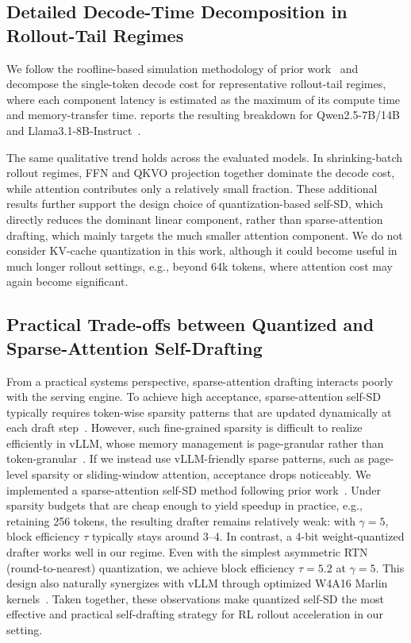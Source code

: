 \subsection{Detailed Decode-Time Decomposition in Rollout-Tail Regimes}
\label{app:decode_breakdown_more}

We follow the roofline-based simulation methodology of prior work~\cite{kim2025beyond} and decompose the single-token decode cost for representative rollout-tail regimes, where each component latency is estimated as the maximum of its compute time and memory-transfer time.
 reports the resulting breakdown for Qwen2.5-7B/14B~\cite{Yang2024Qwen25TR} and Llama3.1-8B-Instruct~\cite{grattafiori2024llama}.

The same qualitative trend holds across the evaluated models.
In shrinking-batch rollout regimes, FFN and QKVO projection together dominate the decode cost, while attention contributes only a relatively small fraction.
These additional results further support the design choice of quantization-based self-SD, which directly reduces the dominant linear component, rather than sparse-attention drafting, which mainly targets the much smaller attention component.
We do not consider KV-cache quantization in this work, although it could become useful in much longer rollout settings, e.g., beyond 64k tokens, where attention cost may again become significant.

\subsection{Practical Trade-offs between Quantized and Sparse-Attention Self-Drafting}
\label{app:practical_quantized_vs_sparse}

From a practical systems perspective, sparse-attention drafting interacts poorly with the serving engine.
To achieve high acceptance, sparse-attention self-SD typically requires token-wise sparsity patterns that are updated dynamically at each draft step~\cite{tang2024quest,yue2026specattn}.
However, such fine-grained sparsity is difficult to realize efficiently in vLLM, whose memory management is page-granular rather than token-granular~\cite{kwon2023efficient}.
If we instead use vLLM-friendly sparse patterns, such as page-level sparsity or sliding-window attention, acceptance drops noticeably.
We implemented a sparse-attention self-SD method following prior work~\cite{yue2026specattn}.
Under sparsity budgets that are cheap enough to yield speedup in practice, e.g., retaining 256 tokens, the resulting drafter remains relatively weak: with $\gamma=5$, block efficiency $\tau$ typically stays around 3--4.
In contrast, a 4-bit weight-quantized drafter works well in our regime.
Even with the simplest asymmetric RTN (round-to-nearest) quantization, we achieve block efficiency $\tau=5.2$ at $\gamma=5$.
This design also naturally synergizes with vLLM through optimized W4A16 Marlin kernels~\cite{frantar2025marlin}.
Taken together, these observations make quantized self-SD the most effective and practical self-drafting strategy for RL rollout acceleration in our setting.




